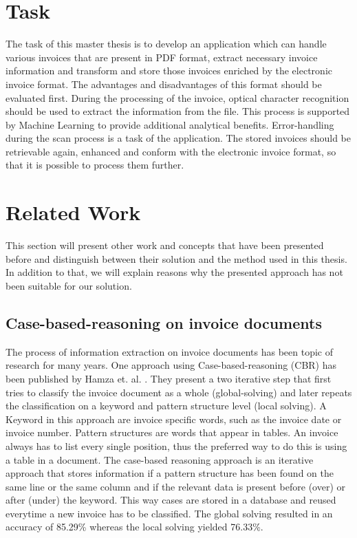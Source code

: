 \section{Task}
\label{sec1.3}

The task of this master thesis is to develop an application which can handle various invoices that are present in PDF format, extract necessary invoice information and transform and store those invoices enriched by the electronic invoice format. The advantages and disadvantages of this format should be evaluated first.
During the processing of the invoice, optical character recognition should be used to extract the information from the file. This process is supported by Machine Learning to provide additional analytical benefits.
Error-handling during the scan process is a task of the application.
The stored invoices should be retrievable again, enhanced and conform with the electronic invoice format, so that it is possible to process them further.

\section{Related Work}
\label{sec1.4}
This section will present other work and concepts that have been presented before and distinguish between their solution and the method used in this thesis. In addition to that, we will explain reasons why the presented approach has not been suitable for our solution.

\subsection{Case-based-reasoning on invoice documents}
The process of information extraction on invoice documents has been topic of research for many years. One approach using Case-based-reasoning (CBR) has been published by Hamza et. al. \cite{hamza07}. They present a two iterative step that first tries to classify the invoice document as a whole (global-solving) and later repeats the classification on a keyword and pattern structure level (local solving). A Keyword in this approach are invoice specific words, such as the invoice date or invoice number. Pattern structures are words that appear in tables. An invoice always has to list every single position, thus the preferred way to do this is using a table in a document.
The case-based reasoning approach is an iterative approach that stores information if a pattern structure has been found on the same line or the same column and if the relevant data is present before (over) or after (under) the keyword. This way cases are stored in a database and reused everytime a new invoice has to be classified. The global solving resulted in an accuracy of 85.29\% whereas the local solving yielded 76.33\%.
